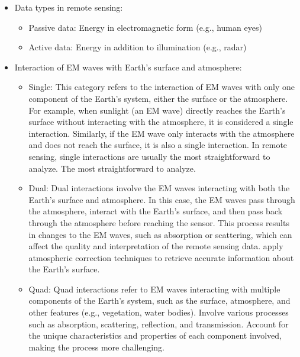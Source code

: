 \documentclass[
  letterpaper,
  DIV=11,
  numbers=noendperiod]{scrreprt}
\providecommand{\tightlist}{%
  \setlength{\itemsep}{0pt}\setlength{\parskip}{0pt}}\usepackage{longtable,booktabs,array}
\begin{document}
\begin{itemize}
\tightlist
\item
  Data types in remote sensing:

  \begin{itemize}
  \tightlist
  \item
    Passive data: Energy in electromagnetic form (e.g., human eyes)
  \item
    Active data: Energy in addition to illumination (e.g., radar)
  \end{itemize}
\item
  Interaction of EM waves with Earth's surface and atmosphere:

  \begin{itemize}
  \tightlist
  \item
    Single: This category refers to the interaction of EM waves with
    only one component of the Earth's system, either the surface or the
    atmosphere. For example, when sunlight (an EM wave) directly reaches
    the Earth's surface without interacting with the atmosphere, it is
    considered a single interaction. Similarly, if the EM wave only
    interacts with the atmosphere and does not reach the surface, it is
    also a single interaction. In remote sensing, single interactions
    are usually the most straightforward to analyze. The most
    straightforward to analyze.
  \item
    Dual: Dual interactions involve the EM waves interacting with both
    the Earth's surface and atmosphere. In this case, the EM waves pass
    through the atmosphere, interact with the Earth's surface, and then
    pass back through the atmosphere before reaching the sensor. This
    process results in changes to the EM waves, such as absorption or
    scattering, which can affect the quality and interpretation of the
    remote sensing data. apply atmospheric correction techniques to
    retrieve accurate information about the Earth's surface.
  \item
    Quad: Quad interactions refer to EM waves interacting with multiple
    components of the Earth's system, such as the surface, atmosphere,
    and other features (e.g., vegetation, water bodies). Involve various
    processes such as absorption, scattering, reflection, and
    transmission. Account for the unique characteristics and properties
    of each component involved, making the process more challenging.
  \end{itemize}
\end{itemize}
\end{document}
